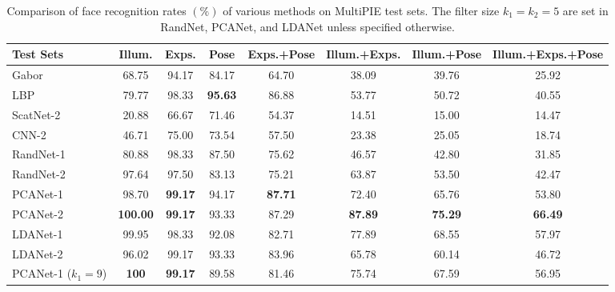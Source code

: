 \documentclass[10pt,journal,compsoc]{IEEEtran}
\begin{document}
\begin{table*}\centering
\caption{Comparison of face recognition rates $(\%)$ of various methods on MultiPIE test sets. The filter size $k_1 = k_2 = 5$ are set in RandNet, PCANet, and LDANet unless specified otherwise.}
\vspace{0.1cm}\begin{tabular}{l|c|c|c|c|c|c|c}
  \hline
Test Sets & Illum. & Exps. & Pose & Exps.+Pose & Illum.+Exps. & Illum.+Pose & Illum.+Exps.+Pose \\ \hline \hline
  Gabor \cite{Liu2002}   & 68.75  & 94.17 & 84.17 & 64.70 & 38.09 & 39.76 & 25.92 \\
  LBP  \cite{Ahonen2006}   & 79.77 & 98.33 & {\bf 95.63} & 86.88 & 53.77 & 50.72 & 40.55 \\
  ScatNet-2 \cite{Bruna2013} & 20.88 & 66.67 & 71.46 & 54.37 & 14.51 & 15.00 & 14.47 \\
  CNN-2 \cite{Krizhevsky2012} & 46.71 & 75.00 & 73.54 & 57.50 & 23.38 & 25.05 & 18.74 \\  \hline
RandNet-1 &    80.88  &    98.33   &    87.50     &     75.62   &       46.57     &     42.80    &       31.85 \\
  RandNet-2 &      97.64  &    97.50   &    83.13    &      75.21    &      63.87    &      53.50  &         42.47 \\
  PCANet-1   & 98.70 & {\bf 99.17} & 94.17 & {\bf 87.71} & 72.40 & 65.76 & 53.80 \\
  PCANet-2   & {\bf 100.00} & {\bf  99.17} & 93.33 & 87.29 & {\bf 87.89} & {\bf 75.29} & {\bf 66.49} \\
  LDANet-1   &  99.95  &    98.33   &    92.08   &       82.71     &     77.89   &       68.55    &       57.97    \\
  LDANet-2   & 96.02  &    99.17  &     93.33    &      83.96    &      65.78    &      60.14      &     46.72    \\ \hline
  PCANet-1 ($k_1 = 9$) & {\bf 100}  & {\bf 99.17} & 89.58 &  81.46 & 75.74 & 67.59 & 56.95  \\
  \hline
\end{tabular}\label{table: MultiPIE}
\end{table*}
\end{document}

